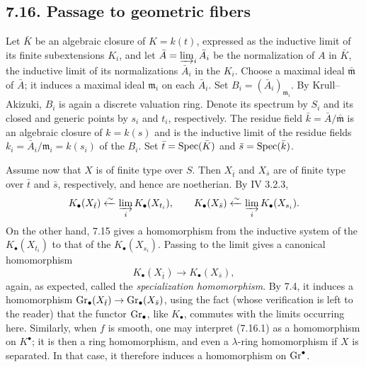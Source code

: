 
\subsection*{7.16. Passage to geometric fibers}
Let $\bar K$ be an algebraic closure of $K=k(t)$, expressed as the inductive
limit of its finite subextensions $K_i$, and let
$\bar A=\varinjlim_i\bar A_i$ be the normalization of $A$ in $\bar K$, the
inductive limit of its normalizations $\bar A_i$ in the $K_i$. Choose a
maximal ideal $\bar{\mathfrak m}$ of $\bar A$; it induces a maximal ideal
$\mathfrak m_i$ on each $\bar A_i$. Set
$B_i=(\bar A_i)_{\mathfrak m_i}$. By Krull--Akizuki, $B_i$ is again a
discrete valuation ring. Denote its spectrum by $S_i$ and its closed and
generic points by $s_i$ and $t_i$, respectively. The residue field
$\bar k=\bar A/\bar{\mathfrak m}$ is an algebraic closure of $k=k(s)$ and is
the inductive limit of the residue fields
$k_i=\bar A_i/\mathfrak m_i=k(s_i)$ of the $B_i$. Set
$\bar t=\operatorname{Spec}(\bar K)$ and $\bar s=\operatorname{Spec}(\bar k)$.

Assume now that $X$ is of finite type over $S$. Then $X_{\bar t}$ and
$X_{\bar s}$ are of finite type over $\bar t$ and $\bar s$, respectively,
and hence are noetherian. By IV 3.2.3,
\[
K_\bullet(X_{\bar t})\xleftarrow{\sim}
  \varinjlim_i K_\bullet(X_{t_i}),
\qquad
K_\bullet(X_{\bar s})\xleftarrow{\sim}
  \varinjlim_i K_\bullet(X_{s_i}).
\]
On the other hand, 7.15 gives a homomorphism from the inductive system of the
$K_\bullet(X_{t_i})$ to that of the $K_\bullet(X_{s_i})$. Passing to the
limit gives a canonical homomorphism
\begin{equation}\tag{7.16.1}
K_\bullet(X_{\bar t})\longrightarrow K_\bullet(X_{\bar s}),
\end{equation}
again, as expected, called the \emph{specialization homomorphism}. By
7.4, it induces a homomorphism
$\operatorname{Gr}_\bullet(X_{\bar t})\to\operatorname{Gr}_\bullet(X_{\bar s})$, using the fact (whose
verification is left to the reader) that the functor $\operatorname{Gr}_\bullet$, like
$K_\bullet$, commutes with the limits occurring here. Similarly, when $f$
is smooth, one may interpret (7.16.1) as a homomorphism on $K^\bullet$; it is
then a ring homomorphism, and even a $\lambda$-ring homomorphism if $X$ is
separated. In that case, it therefore induces a homomorphism on
$\operatorname{Gr}^\bullet$.

